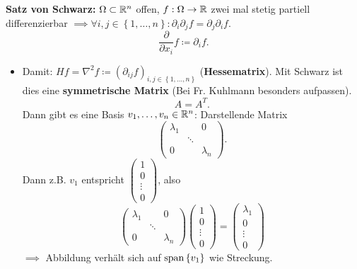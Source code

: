\textbf{Satz von Schwarz:} $ \Omega \subset \mathbb{R} ^n $ offen, $ f: \Omega \to \mathbb{R}  $ zwei mal stetig partiell differenzierbar $ \implies \forall i, j \in \left\{ 1, \dotsc, n \right\} : \partial_i \partial_j f = \partial_j \partial_i f. $
\[
	\frac{ \partial }{ \partial x_i } f \coloneqq \partial_i f.
\]
\begin{itemize}
	\item Damit: $ Hf = \nabla ^2 f \coloneqq \left( \partial_{ij} f \right) _{i, j \in \left\{ 1, \dotsc, n \right\} }  $ (\textbf{Hessematrix}).
		Mit Schwarz ist dies eine \textbf{symmetrische Matrix} (Bei Fr. Kuhlmann besonders aufpassen).
		\[
			A = A^{T} .
		\]
		Dann gibt es eine Basis $ v_1, \dotsc, v_n \in \mathbb{R} ^n $: Darstellende Matrix
		\[
			\begin{pmatrix} \lambda_1 & & 0\\ & \ddots & \\0 & & \lambda_n \end{pmatrix} .
		\]
		Dann z.B. $ v_1 $ entspricht $ \begin{pmatrix} 1 \\ 0 \\ \vdots \\ 0 \end{pmatrix}  $, also
		\[
			\begin{pmatrix} \lambda_1 & & 0\\ & \ddots & \\0 & & \lambda_n \end{pmatrix} \begin{pmatrix} 1 \\ 0 \\ \vdots \\ 0 \end{pmatrix} = \begin{pmatrix} \lambda_1 \\ 0 \\ \vdots \\ 0 \end{pmatrix} 
		\]
		$ \implies  $ Abbildung verhält sich auf $ \operatorname{span} \left\{ v_1 \right\}  $ wie Streckung.
\end{itemize}

